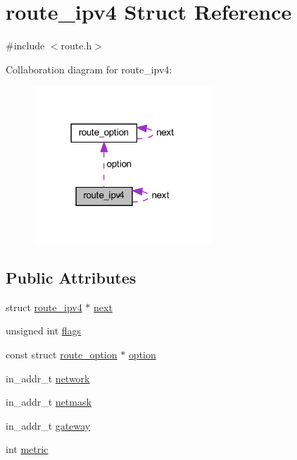 \hypertarget{structroute__ipv4}{}\section{route\+\_\+ipv4 Struct Reference}
\label{structroute__ipv4}


{\ttfamily \#include $<$route.\+h$>$}



Collaboration diagram for route\+\_\+ipv4\+:
\nopagebreak
\begin{figure}[H]
\begin{center}
\leavevmode
\includegraphics[width=190pt]{structroute__ipv4__coll__graph}
\end{center}
\end{figure}
\subsection*{Public Attributes}
\begin{DoxyCompactItemize}
\item 
struct \hyperlink{structroute__ipv4}{route\+\_\+ipv4} $\ast$ \hyperlink{structroute__ipv4_a49d3bfec5422f032e85505762ed45507}{next}
\item 
unsigned int \hyperlink{structroute__ipv4_aefec4e9a3022ad0d5e6f8c68905d2ad7}{flags}
\item 
const struct \hyperlink{structroute__option}{route\+\_\+option} $\ast$ \hyperlink{structroute__ipv4_a0423e77fc01b5bc05771824d51740fe3}{option}
\item 
in\+\_\+addr\+\_\+t \hyperlink{structroute__ipv4_ab38b0a2ab01c05b74c40c32b9b486e96}{network}
\item 
in\+\_\+addr\+\_\+t \hyperlink{structroute__ipv4_ac423abdde955f3da899a72382763b470}{netmask}
\item 
in\+\_\+addr\+\_\+t \hyperlink{structroute__ipv4_ad7a3c222084b1c670a62dc6d3d0f2fb5}{gateway}
\item 
int \hyperlink{structroute__ipv4_a05f41b340e53a6c8292fefc84204ea74}{metric}
\end{DoxyCompactItemize}


